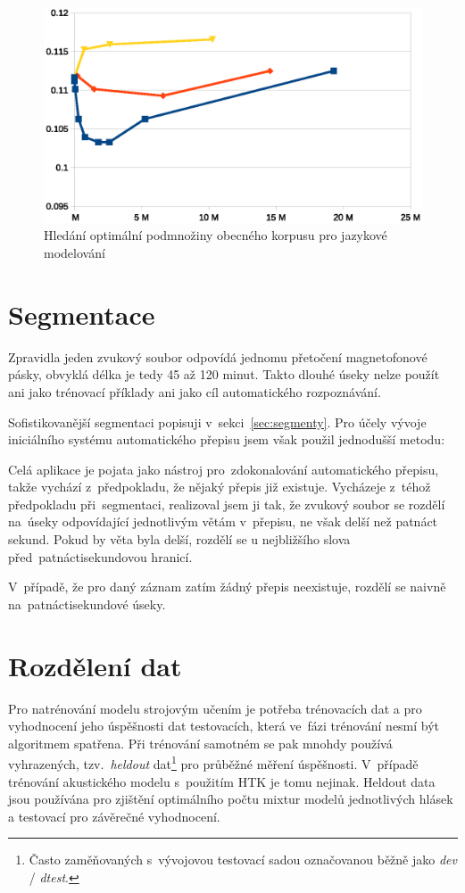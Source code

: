 \begin{figure}[htpb]
\includegraphics[scale=1]{rc/lm-plz-scores.eps}
\caption{
  Hledání optimální podmnožiny obecného korpusu pro jazykové modelování
}
\label{fig:lm-plz-scores}
\end{figure}

\section{Segmentace}

Zpravidla jeden zvukový soubor odpovídá jednomu přetočení magnetofonové pásky,
obvyklá délka je tedy 45 až 120 minut. Takto dlouhé úseky nelze použít ani jako
trénovací příklady ani jako cíl automatického rozpoznávání.

Sofistikovanější segmentaci popisuji v~sekci~\ref{sec:segmenty}. Pro účely
vývoje iniciálního systému automatického přepisu jsem však použil jednodušší
metodu:

Celá aplikace je pojata jako nástroj pro~zdokonalování automatického přepisu,
takže vychází z~předpokladu, že nějaký přepis již existuje. Vycházeje z~téhož
předpokladu při~segmentaci, realizoval jsem ji tak, že zvukový soubor se rozdělí
na~úseky odpovídající jednotlivým větám v~přepisu, ne však delší než patnáct
sekund. Pokud by věta byla delší, rozdělí se u nejbližšího slova
před~patnáctisekundovou hranicí.

V~případě, že pro daný záznam zatím žádný přepis neexistuje, rozdělí se naivně
na~patnáctisekundové úseky.

\section{Rozdělení dat}
\label{sec:asr:rozdeleni-dat}

Pro natrénování modelu strojovým učením je potřeba trénovacích dat a pro
vyhodnocení jeho úspěšnosti dat testovacích, která ve~fázi trénování nesmí být
algoritmem spatřena. Při trénování samotném se pak mnohdy používá vyhrazených,
tzv.~\textit{heldout} dat\footnote{Často zaměňovaných s~vývojovou testovací sadou
označovanou běžně jako \textit{dev} / \textit{dtest}.} pro průběžné měření úspěšnosti. V~případě trénování
akustického modelu s~použitím HTK je tomu nejinak. Heldout data jsou používána
pro zjištění optimálního počtu mixtur modelů jednotlivých hlásek a testovací
pro závěrečné vyhodnocení.

